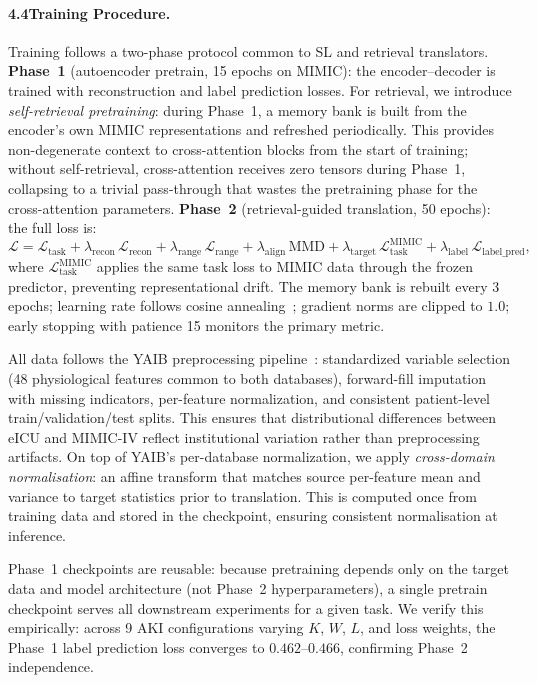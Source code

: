 \paragraph{4.4\quad Training Procedure.}
\label{sec:training}
Training follows a two-phase protocol common to SL and retrieval translators.
\textbf{Phase~1} (autoencoder pretrain, 15 epochs on MIMIC): the encoder--decoder is trained with reconstruction and label prediction losses.
For retrieval, we introduce \emph{self-retrieval pretraining}: during Phase~1, a memory bank
is built from the encoder's own MIMIC representations and refreshed periodically.
This provides non-degenerate context to cross-attention blocks from the start of training;
without self-retrieval, cross-attention receives zero tensors during Phase~1, collapsing
to a trivial pass-through that wastes the pretraining phase for the cross-attention parameters.
\textbf{Phase~2} (retrieval-guided translation, 50 epochs): the full loss is:
\begin{equation}
\label{eq:full_loss}
\mathcal{L} = \mathcal{L}_{\mathrm{task}} + \lambda_{\mathrm{recon}}\,\mathcal{L}_{\mathrm{recon}} + \lambda_{\mathrm{range}}\,\mathcal{L}_{\mathrm{range}} + \lambda_{\mathrm{align}}\,\mathrm{MMD} + \lambda_{\mathrm{target}}\,\mathcal{L}_{\mathrm{task}}^{\mathrm{MIMIC}} + \lambda_{\mathrm{label}}\,\mathcal{L}_{\mathrm{label\_pred}},
\end{equation}
where $\mathcal{L}_{\mathrm{task}}^{\mathrm{MIMIC}}$ applies the same task loss to MIMIC data through the frozen predictor, preventing representational drift.
The memory bank is rebuilt every 3 epochs; learning rate follows cosine annealing~\cite{loshchilov2017sgdr}; gradient norms are clipped to $1.0$; early stopping with patience 15 monitors the primary metric.

All data follows the YAIB preprocessing pipeline~\cite{vandewater2024yaib}: standardized variable selection (48 physiological features common to both databases), forward-fill imputation with missing indicators, per-feature normalization, and consistent patient-level train/validation/test splits.
This ensures that distributional differences between eICU and MIMIC-IV reflect institutional variation rather than preprocessing artifacts.
On top of YAIB's per-database normalization, we apply \emph{cross-domain normalisation}: an affine transform that matches source per-feature mean and variance to target statistics prior to translation.
This is computed once from training data and stored in the checkpoint, ensuring consistent normalisation at inference.

Phase~1 checkpoints are reusable: because pretraining depends only on the target data and model architecture (not Phase~2 hyperparameters), a single pretrain checkpoint serves all downstream experiments for a given task.
We verify this empirically: across 9 AKI configurations varying $K$, $W$, $L$, and loss weights, the Phase~1 label prediction loss converges to $0.462$--$0.466$, confirming Phase~2 independence.
